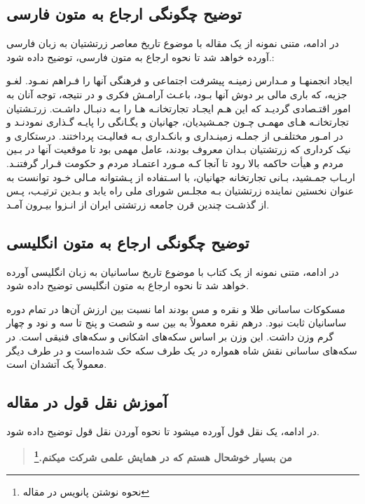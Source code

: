 \documentclass[twoside]{article}
\newcommand{\عنوان}{عنوان ارائه}
\newcommand{\نام}{نام و نام خانوادگی}
\newcommand{\رشته}{رشته}
\newcommand{\دانشگاه}{دانشگاه}
\newcommand{\همکار}{نام و نام خانوادگی همکار}
\begin{document}
\subsection{توضیح چگونگی ارجاع به متون فارسی}
\noindent در ادامه، متنی نمونه از یک مقاله با موضوع تاریخ معاصر زرتشتیان به زبان فارسی آورده خواهد شد تا نحوه ارجاع به متون فارسی، توضیح داده شود.:

ایجاد انجمنهـا و مـدارس زمینـه پیشرفت اجتماعی و فرهنگی آنها را فـراهم نمـود. لغـو جزیه، که باری مالی بر دوش آنها بـود، باعـث آرامـش فکری و در نتیجه، توجه آنان به امور اقتـصادی گردیـد که این هـم ایجـاد تجارتخانـه هـا را بـه دنبـال داشـت.  زرتـشتیان تجارتخانـه هـای مهمـی چـون جمـشیدیان، جهانیان و یگـانگی را پایـه گـذاری نمودنـد و در امـور مختلفـی از جملـه زمینـداری و بانکـداری بـه فعالیـت پرداختند. درستکاری و نیک کرداری که زرتشتیان بـدان معروف بودند، عامل مهمی بود تا موقعیت آنها در بـین مردم و هیأت حاکمه بالا رود تا آنجا کـه مـورد اعتمـاد مردم و حکومت قـرار گرفتنـد. اربـاب جمـشید، بـانی تجارتخانه جهانیان، با اسـتفاده از پـشتوانه مـالی خـود توانست به عنوان نخستین نماینده زرتشتیان بـه مجلـس شورای ملی راه یابد و بـدین ترتیـب، پـس از گذشـت چندین قرن جامعه زرتشتی ایران از انـزوا بیـرون آمـد. \cite{Oshidari}

\subsection{توضیح چگونگی ارجاع به متون انگلیسی}
\noindent در ادامه، متنی نمونه از یک کتاب با موضوع تاریخ ساسانیان به زبان انگلیسی آورده خواهد شد تا نحوه ارجاع به متون انگلیسی توضیح داده شود.

مسکوکات ساسانی طلا و نقره و مس بودند اما نسبت بین ارزش آن‌ها در تمام دوره ساسانیان ثابت نبود. درهم نقره معمولاً به بین سه و شصت و پنج تا سه و نود و چهار گرم وزن داشت. این وزن بر اساس سکه‌های اشکانی و سکه‌های فنیقی است. در سکه‌های ساسانی نقش شاه همواره در یک طرف سکه حک شده‌است و در طرف دیگر معمولاً یک آتشدان است. \cite{Daryaee}
\subsection{آموزش نقل قول در مقاله}
\noindent در ادامه، یک نقل قول آورده میشود تا نحوه آوردن نقل قول توضیح داده شود.
\begin{quote}\textbf{
من بسیار خوشحال هستم که در همایش علمی شرکت میکنم.\footnote{نحوه نوشتن پانویس در مقاله}
}\end{quote}
\end{document}
